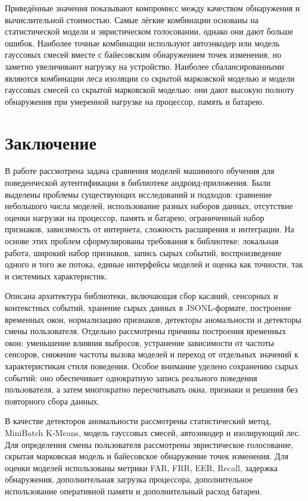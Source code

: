 \documentclass[oneside,senior,etd]{BYUPhys}
\begin{document}
Приведённые значения показывают компромисс между качеством обнаружения и вычислительной стоимостью. Самые лёгкие комбинации основаны на статистической модели и эвристическом голосовании, однако они дают больше ошибок. Наиболее точные комбинации используют автоэнкодер или модель гауссовых смесей вместе с байесовским обнаружением точек изменения, но заметно увеличивают нагрузку на устройство. Наиболее сбалансированными являются комбинации леса изоляции со скрытой марковской моделью и модели гауссовых смесей со скрытой марковской моделью: они дают высокую полноту обнаружения при умеренной нагрузке на процессор, память и батарею.

\section{Заключение}

В работе рассмотрена задача сравнения моделей машинного обучения для поведенческой аутентификации в библиотеке андроид-приложения. Были выделены проблемы существующих исследований и подходов: сравнение небольшого числа моделей, использование разных наборов данных, отсутствие оценки нагрузки на процессор, память и батарею, ограниченный набор признаков, зависимость от интернета, сложность расширения и интеграции. На основе этих проблем сформулированы требования к библиотеке: локальная работа, широкий набор признаков, запись сырых событий, воспроизведение одного и того же потока, единые интерфейсы моделей и оценка как точности, так и системных характеристик.

Описана архитектура библиотеки, включающая сбор касаний, сенсорных и контекстных событий, хранение сырых данных в JSONL-формате, построение временных окон, нормализацию признаков, детекторы аномальности и детекторы смены пользователя. Отдельно рассмотрены причины построения временных окон: уменьшение влияния выбросов, устранение зависимости от частоты сенсоров, снижение частоты вызова моделей и переход от отдельных значений к характеристикам стиля поведения. Особое внимание уделено сохранению сырых событий: оно обеспечивает однократную запись реального поведения пользователя, а затем многократно пересчитывать окна, признаки и решения без повторного сбора данных.

В качестве детекторов аномальности рассмотрены статистический метод, MiniBatch K-Means, модель гауссовых смесей, автоэнкодер и изолирующий лес. Для определения смены пользователя рассмотрены эвристическое голосование, скрытая марковская модель и байесовское обнаружение точек изменения. Для оценки моделей использованы метрики FAR, FRR, EER, Recall, задержка обнаружения, дополнительная загрузка процессора, дополнительное использование оперативной памяти и дополнительный расход батареи.
\end{document}
